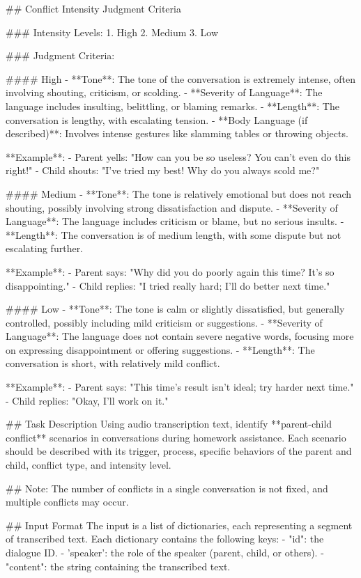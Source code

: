 \begin{spverbatim}
## Conflict Intensity Judgment Criteria

### Intensity Levels:
1. High 2. Medium 3. Low

### Judgment Criteria:

#### High
- **Tone**: The tone of the conversation is extremely intense, often involving shouting, criticism, or scolding.
- **Severity of Language**: The language includes insulting, belittling, or blaming remarks.
- **Length**: The conversation is lengthy, with escalating tension.
- **Body Language (if described)**: Involves intense gestures like slamming tables or throwing objects.

**Example**:
- Parent yells: "How can you be so useless? You can't even do this right!"
- Child shouts: "I've tried my best! Why do you always scold me?"

#### Medium
- **Tone**: The tone is relatively emotional but does not reach shouting, possibly involving strong dissatisfaction and dispute.
- **Severity of Language**: The language includes criticism or blame, but no serious insults.
- **Length**: The conversation is of medium length, with some dispute but not escalating further.

**Example**:
- Parent says: "Why did you do poorly again this time? It's so disappointing."
- Child replies: "I tried really hard; I'll do better next time."

#### Low
- **Tone**: The tone is calm or slightly dissatisfied, but generally controlled, possibly including mild criticism or suggestions.
- **Severity of Language**: The language does not contain severe negative words, focusing more on expressing disappointment or offering suggestions.
- **Length**: The conversation is short, with relatively mild conflict.

**Example**:
- Parent says: "This time's result isn't ideal; try harder next time."
- Child replies: "Okay, I'll work on it."

## Task Description
Using audio transcription text, identify **parent-child conflict** scenarios in conversations during homework assistance. Each scenario should be described with its trigger, process, specific behaviors of the parent and child, conflict type, and intensity level.

## Note: The number of conflicts in a single conversation is not fixed, and multiple conflicts may occur.

## Input Format
The input is a list of dictionaries, each representing a segment of transcribed text. Each dictionary contains the following keys:
- "id": the dialogue ID.
- 'speaker': the role of the speaker (parent, child, or others).
- "content": the string containing the transcribed text.


\end{spverbatim}
